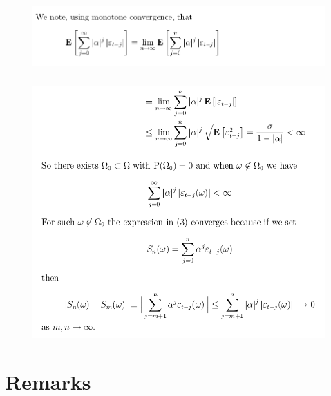 \documentclass[c, dvipsnames, 8pt]{beamer}
\begin{document}
\begin{frame}[shrink=5]
	
	
	
	\frametitle{\insertsection} 
	\begin{figure}
		\centering
		\includegraphics[width=1\linewidth]{screenshot026}
		\label{fig:screenshot001}
	\end{figure}


\frametitle{\insertsection} 
\begin{figure}
	\centering
	\includegraphics[width=1\linewidth]{screenshot027}
	\label{fig:screenshot001}
\end{figure}
	
	
\end{frame}


\section{Remarks}
\end{document}
